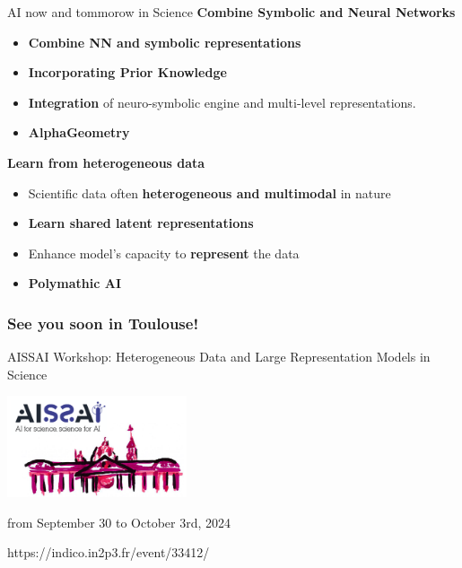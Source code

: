 \begin{frame}{AI now and tommorow in Science}
  \textbf{Combine Symbolic and Neural Networks} 
    \begin{itemize}
      \item \textbf{Combine NN and symbolic representations} 
      \item \textbf{Incorporating Prior Knowledge} 
      \item \textbf{Integration} of neuro-symbolic engine and multi-level representations.
      \item \textbf{AlphaGeometry}
    \end{itemize}
  
  \textbf{Learn from heterogeneous data}
  \begin{itemize}
    \item Scientific data often \textbf{heterogeneous and multimodal} in nature
    \item \textbf{Learn shared latent representations}
    \item Enhance model's capacity to \textbf{represent} the data
    \item \textbf{Polymathic AI}
  \end{itemize}  


\end{frame}

\begin{frame}
  \frametitle{See you soon in Toulouse!}
  \begin{center}\LARGE AISSAI Workshop: Heterogeneous Data and Large Representation Models in Science\end{center}
  \begin{center}\includegraphics[width=200px]{img/invitation.png}\end{center}

  \begin{center}\large from September 30 to October 3rd, 2024\end{center}
  \begin{center}\large https://indico.in2p3.fr/event/33412/\end{center}
\end{frame}





